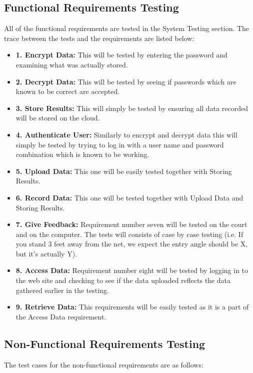\documentclass{article}
\begin{document}
\subsection{Functional Requirements Testing}
All of the functional requirements are tested in the System Testing section. The trace between the tests and the requirements are listed below:
\begin{itemize}
    \item \textbf{1. Encrypt Data:} This will be tested by entering the password and examining what was actually stored.
    \item \textbf{2. Decrypt Data:} This will be tested by seeing if passwords which are known to be correct are accepted.
    \item \textbf{3. Store Results:} This will simply be tested by ensuring all data recorded will be stored on the cloud.
    \item \textbf{4. Authenticate User:} Similarly to encrypt and decrypt data this will simply be tested by trying to log in with a user name and password combination which is known to be working.
    \item \textbf{5. Upload Data:} This one will be easily tested together with Storing Results.
    \item \textbf{6. Record Data:} This one will be tested together with Upload Data and Storing Results.
    \item \textbf{7. Give Feedback:} Requirement number seven will be tested on the court and on the computer. The tests will consists of case by case testing (i.e. If you stand 3 feet away from the net, we expect the entry angle should be X, but it's actually Y).
    \item \textbf{8. Access Data:} Requirement number eight will be tested by logging in to the web site and checking to see if the data uploaded reflects the data gathered earlier in the testing.
    \item \textbf{9. Retrieve Data:} This requirements will be easily tested as it is a part of the Access Data requirement.
\end{itemize}

\subsection{Non-Functional Requirements Testing}
The test cases for the non-functional requirements are as follows:
\\
\end{document}

